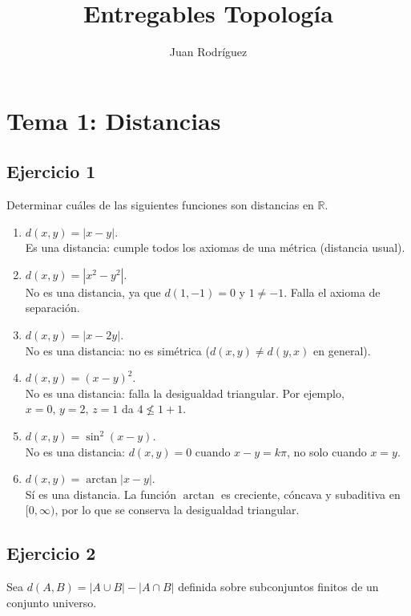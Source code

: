 \usepackage{asmath}
\title{Entregables Topología}
\author{Juan Rodríguez}
\date{}

\maketitle
\section*{Tema 1: Distancias}

\subsection*{Ejercicio 1}
Determinar cuáles de las siguientes funciones son distancias en $\mathbb{R}$.

\begin{enumerate}[label=\alph*)]
\item $d(x,y) = |x - y|$. \\
Es una distancia: cumple todos los axiomas de una métrica (distancia usual).

\item $d(x,y) = |x^2 - y^2|$. \\
No es una distancia, ya que $d(1,-1)=0$ y $1\neq -1$. Falla el axioma de separación.

\item $d(x,y) = |x - 2y|$. \\
No es una distancia: no es simétrica ($d(x,y)\neq d(y,x)$ en general).

\item $d(x,y) = (x - y)^2$. \\
No es una distancia: falla la desigualdad triangular. Por ejemplo, $x=0,\, y=2,\, z=1$ da $4\nleq 1+1$.

\item $d(x,y) = \sin^2(x - y)$. \\
No es una distancia: $d(x,y)=0$ cuando $x - y = k\pi$, no solo cuando $x=y$.

\item $d(x,y) = \arctan|x - y|$. \\
Sí es una distancia. La función $\arctan$ es creciente, cóncava y subaditiva en $[0,\infty)$, por lo que se conserva la desigualdad triangular.
\end{enumerate}

\subsection*{Ejercicio 2}
Sea $d(A,B) = |A\cup B| - |A\cap B|$ definida sobre subconjuntos finitos de un conjunto universo.

